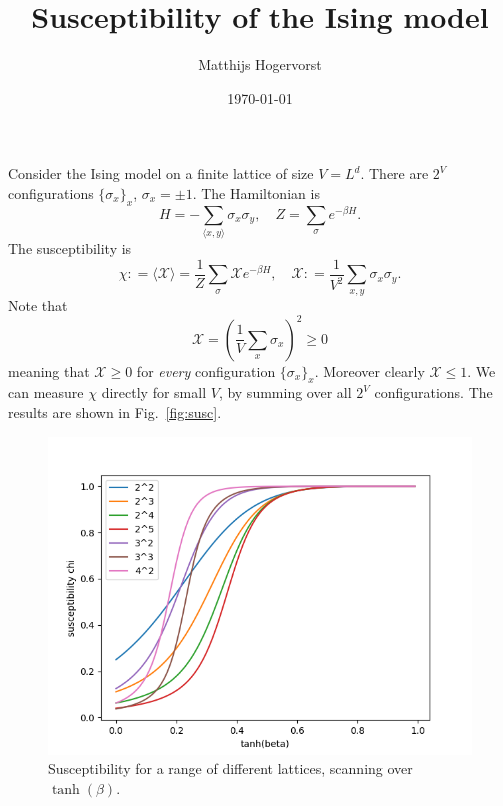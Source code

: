 \documentclass[10pt,letterpaper]{article}
\newcommand\beq{\begin{equation}}
\newcommand\eeq{\end{equation}}
\newcommand{\expec}[1]{\langle #1 \rangle}
\def\ldef{\mathrel{\mathop:}=}
\def\mca{\mathcal}
\begin{document}
\title{Susceptibility of the Ising model}
\author{Matthijs Hogervorst}
\date\today
\maketitle

Consider the Ising model on a finite lattice of size $V = L^d$. There
are $2^V$ configurations $\{\sigma_x\}_x$, $\sigma_x = \pm 1$. The
Hamiltonian is
\beq
H = - \sum_{\expec{x,y}} \sigma_x \sigma_y,
\quad
Z = \sum_{\sigma} e^{-\beta H}.
\eeq
The susceptibility is
\beq
\chi \ldef \expec{\mca{X}} = \frac{1}{Z} \sum_\sigma \mca{X} e^{-\beta H},
\quad
\mca{X} \ldef \frac{1}{V^2} \sum_{x,y} \sigma_x \sigma_y.
\eeq
Note that
\beq
\mca{X} = \left(\frac{1}{V} \sum_x \sigma_x\right)^2 \geq 0
\eeq
meaning that $\mca{X} \geq 0$ for \emph{every} configuration
$\{\sigma_x\}_x$. Moreover clearly $\mca{X} \leq 1$. We can measure
$\chi$ directly for small $V$, by summing over all $2^V$
configurations. The results are shown in Fig.~\ref{fig:susc}.
\begin{figure}[htbp]
  \begin{center}
    \includegraphics[scale=0.5]{suscepPlot.png}
    \caption{Susceptibility for a range of different lattices,
      scanning over $\tanh(\beta)$.}
  \end{center}
\end{figure}
\end{document}
